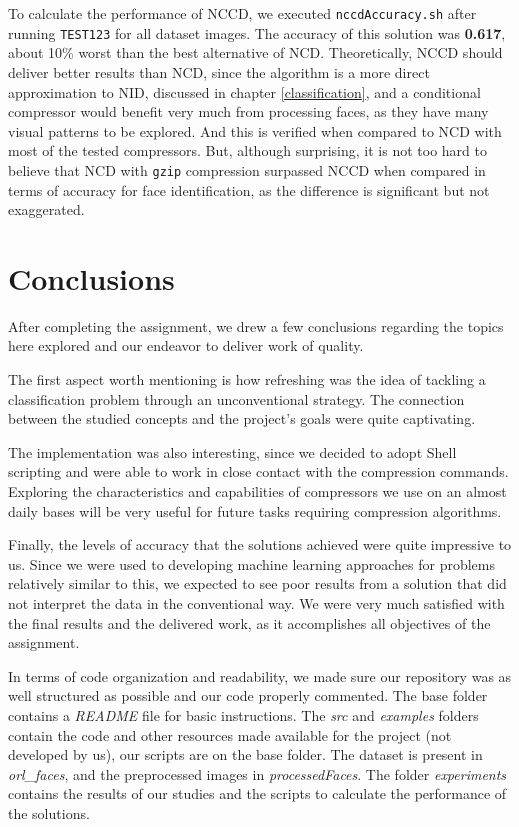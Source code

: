 \documentclass[12pt]{article}
\begin{document}
To calculate the performance of NCCD, we executed \texttt{nccdAccuracy.sh} after running \texttt{TEST123} for all dataset images.
The accuracy of this solution was \textbf{0.617}, about 10\% worst than the best alternative of NCD.
Theoretically, NCCD should deliver better results than NCD, since the algorithm is a more direct approximation to NID, discussed in chapter \ref{classification},
and a conditional compressor would benefit very much from processing faces, as they have many visual patterns to be explored.
And this is verified when compared to NCD with most of the tested compressors.
But, although surprising, it is not too hard to believe that NCD with \texttt{gzip} compression surpassed NCCD when compared in terms of accuracy for face 
identification, as the difference is significant but not exaggerated.

\newpage
\section{Conclusions} %

After completing the assignment, we drew a few conclusions regarding the topics here explored and our endeavor to deliver work of quality.

The first aspect worth mentioning is how refreshing was the idea of tackling a classification problem through an unconventional strategy.
The connection between the studied concepts and the project's goals were quite captivating.

The implementation was also interesting, since we decided to adopt Shell scripting and were able to work in close contact with the compression commands.
Exploring the characteristics and capabilities of compressors we use on an almost daily bases will be very useful for future tasks requiring compression algorithms.

Finally, the levels of accuracy that the solutions achieved were quite impressive to us.
Since we were used to developing machine learning approaches for problems relatively similar to this, we expected to see poor results from a solution that did 
not interpret the data in the conventional way.
We were very much satisfied with the final results and the delivered work, as it accomplishes all objectives of the assignment.

In terms of code organization and readability, we made sure our repository was as well structured as possible and our code properly commented.
The base folder contains a \textit{README} file for basic instructions.
The \textit{src} and \textit{examples} folders contain the code and other resources made available for the project (not developed by us), our scripts are on the base folder.
The dataset is present in \textit{orl\_faces}, and the preprocessed images in \textit{processedFaces}.
The folder \textit{experiments} contains the results of our studies and the scripts to calculate the performance of the solutions.
\end{document}
